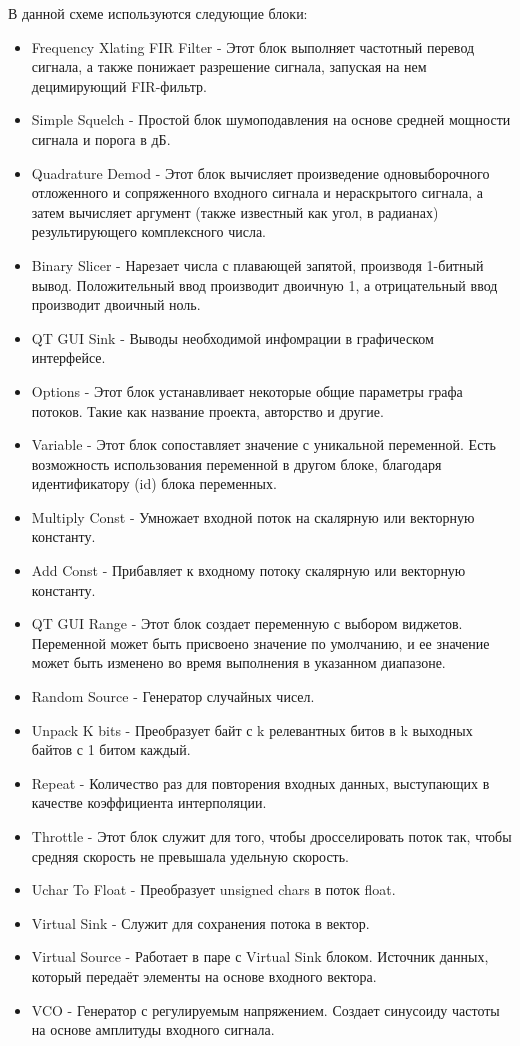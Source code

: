 В данной схеме используются следующие блоки:
\begin{itemize}
	\item Frequency Xlating FIR Filter - Этот блок выполняет частотный перевод сигнала, а также понижает разрешение сигнала, запуская на нем децимирующий FIR-фильтр.
	\item Simple Squelch - Простой блок шумоподавления на основе средней мощности сигнала и порога в дБ.
	\item Quadrature Demod - Этот блок вычисляет произведение одновыборочного отложенного и сопряженного входного сигнала и нераскрытого сигнала, а затем вычисляет аргумент (также известный как угол, в радианах) результирующего комплексного числа.
	\item Binary Slicer - Нарезает числа с плавающей запятой, производя 1-битный вывод. Положительный ввод производит двоичную 1, а отрицательный ввод производит двоичный ноль. 
	\item QT GUI Sink - Выводы необходимой инфомрации в графическом интерфейсе.
    \item Options - Этот блок устанавливает некоторые общие параметры графа потоков. Такие как название проекта, авторство и другие. 
	\item Variable - Этот блок сопоставляет значение с уникальной переменной. Есть возможность использования переменной в другом блоке, благодаря идентификатору (id) блока переменных. 
	\item Multiply Const - Умножает входной поток на скалярную или векторную константу.
	\item Add Const - Прибавляет к входному потоку скалярную или векторную константу.
	\item QT GUI Range - Этот блок создает переменную с выбором виджетов. Переменной может быть присвоено значение по умолчанию, и ее значение может быть изменено во время выполнения в указанном диапазоне.
	\item Random Source - Генератор случайных чисел.
	\item Unpack K bits - Преобразует байт с k релевантных битов в k выходных байтов с 1 битом каждый.
	\item Repeat - Количество раз для повторения входных данных, выступающих в качестве коэффициента интерполяции.
	\item Throttle - Этот блок служит для того, чтобы дросселировать поток так, чтобы средняя скорость не превышала удельную скорость.
	\item Uchar To Float - Преобразует unsigned chars в поток float.
	\item Virtual Sink - Служит для сохранения потока в вектор.
	\item Virtual Source - Работает в паре с Virtual Sink блоком. Источник данных, который передаёт элементы на основе входного вектора. 
	\item VCO - Генератор с регулируемым напряжением. Создает синусоиду частоты на основе амплитуды входного сигнала.
\end{itemize}

